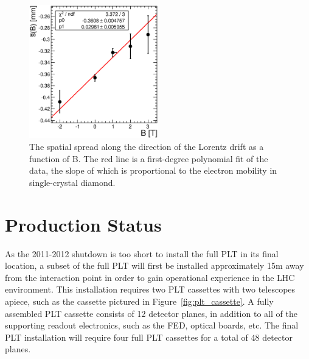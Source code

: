 \documentclass[journal]{IEEEtran}
\begin{document}
\begin{figure}[!h]
\centering
\includegraphics[width=0.5\textwidth]{plt-offsets-with-errors}
\caption{ The spatial spread along the direction of the Lorentz drift as a function of B.  The red line is a first-degree polynomial fit of the data, the slope of which is proportional to the electron mobility in single-crystal diamond. }
\label{fig:offsets}
\end{figure}




%
%
\section{Production Status}
As the 2011-2012 shutdown is too short to install the full PLT in its final location, a subset of the full PLT will first be installed approximately 15m away from the interaction point in order to gain operational experience in the LHC environment.  This installation requires two PLT cassettes with two telescopes apiece, such as the cassette pictured in Figure~\ref{fig:plt_cassette}.  A fully assembled PLT cassette consists of 12 detector planes, in addition to all of the supporting readout electronics, such as the FED, optical boards, etc.  The final PLT installation will require four full PLT cassettes for a total of 48 detector planes.  
\end{document}
